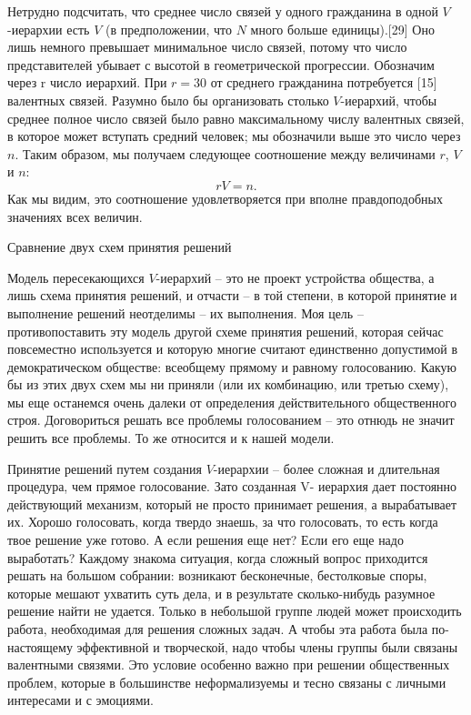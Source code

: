 \documentclass{book}
\begin{document}
Нетрудно подсчитать, что среднее число связей у одного гражданина в одной $V$-иерархии есть $V$ (в предположении, что $N$ много больше единицы).[29] Оно лишь немного превышает мини­мальное число связей, потому что число представителей убывает с высотой в геометрической прогрессии. Обозначим через r  число иерархий. При $r= 30$  от среднего гражданина потребуется [15] валент­ных связей. Разумно было бы организовать столько $V$-иерар­хий, чтобы среднее полное число связей было равно максималь­ному числу валентных связей, в которое может вступать средний человек; мы обозначили выше это число через $n$.  Таким обра­зом, мы получаем следующее соотношение между величинами $r$, $V$ и $n$: 
\[
	rV=n.
\]
Как мы видим, это соотношение удовлетворяется при вполне правдоподобных значениях всех величин.

Сравнение двух схем принятия решений

Модель пересекающихся $V$-иерархий -- это не проект устройст­ва общества, а лишь схема принятия решений, и отчасти -- в той степени, в которой принятие и выполнение решений неотделимы -- их выполнения. Моя цель -- противопоставить эту мо­дель другой схеме принятия решений, которая сейчас повсеместно используется и которую многие считают единственно допустимой в демократическом обществе: всеобщему прямому и равному голосованию. Какую бы из этих двух схем мы ни приняли (или их комбинацию, или третью схему), мы еще останемся очень далеки от определения действительного общественного строя. Договориться решать все проблемы голосованием -- это отнюдь не значит решить все проблемы. То же относится и к нашей мо­дели.

Принятие решений путем создания $V$-иерархии -- более слож­ная и длительная процедура, чем прямое голосование. Зато со­зданная V-  иерархия дает постоянно действующий механизм, ко­торый не просто принимает решения, а вырабатывает  их. Хорошо голосовать, когда твердо знаешь, за что голосовать, то есть когда твое решение уже готово. А если решения еще нет? Если его еще надо выработать? Каждому знакома ситуация, когда сложный вопрос приходится решать на большом собрании: возникают бесконечные, бестолковые споры, которые мешают ухватить суть дела, и в результате сколько-нибудь разумное решение най­ти не удается. Только в небольшой группе людей может проис­ходить работа, необходимая для решения сложных задач. А что­бы эта работа была по-настоящему эффективной и творческой, надо чтобы члены группы были связаны валентными связями. Это условие особенно важно при решении общественных проб­лем, которые в большинстве неформализуемы и тесно связаны с личными интересами и с эмоциями.
\end{document}
